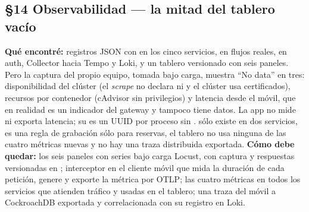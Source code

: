 \subsection*{\S14 Observabilidad --- la mitad del tablero vac\'io}
\textbf{Qu\'e encontr\'e:} registros JSON con  en los cinco servicios,  en flujos reales,  en auth, Collector hacia Tempo y Loki, y un tablero versionado con seis paneles. Pero la captura del propio equipo, tomada bajo carga, muestra ``No data'' en tres: disponibilidad del cl\'uster (el \emph{scrape} no declara  ni  y el cl\'uster usa certificados), recursos por contenedor (cAdvisor sin privilegios) y latencia desde el m\'ovil, que en realidad es un indicador del gateway y tampoco tiene datos. La app no mide ni exporta latencia; su  es un UUID por proceso sin .  s\'olo existe en dos servicios,  es una regla de grabaci\'on s\'olo para reservas, el tablero no usa ninguna de las cuatro m\'etricas nuevas y no hay una traza distribuida exportada. \textbf{C\'omo debe quedar:} los seis paneles con series bajo carga Locust, con captura y respuestas  versionadas en ; interceptor en el cliente m\'ovil que mida la duraci\'on de cada petici\'on, genere  y exporte la m\'etrica por OTLP; las cuatro m\'etricas en todos los servicios que atienden tr\'afico y usadas en el tablero; una traza del m\'ovil a CockroachDB exportada y correlacionada con su registro en Loki.

